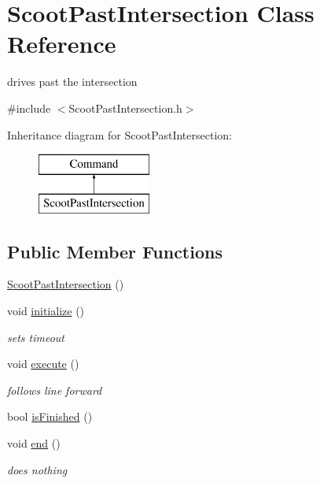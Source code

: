\hypertarget{classScootPastIntersection}{\section{Scoot\-Past\-Intersection Class Reference}
\label{classScootPastIntersection}
}


drives past the intersection  




{\ttfamily \#include $<$Scoot\-Past\-Intersection.\-h$>$}

Inheritance diagram for Scoot\-Past\-Intersection\-:\begin{figure}[H]
\begin{center}
\leavevmode
\includegraphics[height=2.000000cm]{classScootPastIntersection}
\end{center}
\end{figure}
\subsection*{Public Member Functions}
\begin{DoxyCompactItemize}
\item 
\hyperlink{classScootPastIntersection_ac496bf3a58f4754025b32757c3fb1094}{Scoot\-Past\-Intersection} ()
\item 
void \hyperlink{classScootPastIntersection_a8f741b21641a42bb5bcf4e0b67c6f0b5}{initialize} ()
\begin{DoxyCompactList}\small\item\em sets timeout \end{DoxyCompactList}\item 
void \hyperlink{classScootPastIntersection_adce5027b638c8d23dbcff7cbb837885f}{execute} ()
\begin{DoxyCompactList}\small\item\em follows line forward \end{DoxyCompactList}\item 
bool \hyperlink{classScootPastIntersection_a190d072051601ebc40b193d91bc323df}{is\-Finished} ()
\item 
void \hyperlink{classScootPastIntersection_a7696d93dc3789a4f3923aba22028b093}{end} ()
\begin{DoxyCompactList}\small\item\em does nothing \end{DoxyCompactList}\end{DoxyCompactItemize}
